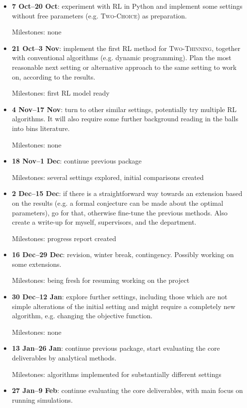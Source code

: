\documentclass[11pt,a4paper]{article}
\begin{document}
\begin{itemize}
    \item 
    \textbf{7 Oct--20 Oct}: experiment with RL in Python and implement some settings without free parameters (e.g. \textsc{Two-Choice}) as preparation.
    
    Milestones: none
    \item
    \textbf{21 Oct--3 Nov}: implement the first RL method for \textsc{Two-Thinning}, together with conventional algorithms (e.g. dynamic programming). Plan the most reasonable next setting or alternative approach to the same setting to work on, according to the results.
    
    Milestones: first RL model ready
    \item
    \textbf{4 Nov--17 Nov}: turn to other similar settings, potentially try multiple RL algorithms. It will also require some further background reading in the balls into bins literature.
    
    Milestones: none
    \item
    \textbf{18 Nov--1 Dec}: continue previous package
    
    Milestones: several settings explored, initial comparisons created
    \item
    \textbf{2 Dec--15 Dec}: if there is a straightforward way towards an extension based on the results (e.g. a formal conjecture can be made about the optimal parameters), go for that, otherwise fine-tune the previous methods. Also create a write-up for myself, supervisors, and the department.
   
    Milestones: progress report created
    \item
    \textbf{16 Dec--29 Dec}: revision, winter break, contingency. Possibly working on some extensions.
    
    Milestones: being fresh for resuming working on the project
    \item
    \textbf{30 Dec--12 Jan}: explore further settings, including those which are not simple alterations of the initial setting and might require a completely new algorithm, e.g. changing the objective function.
    
    Milestones: none
    \item
    \textbf{13 Jan--26 Jan}: continue previous package, start evaluating the core deliverables by analytical methods.
    
    Milestones: algorithms implemented for substantially different settings
    \item
    \textbf{27 Jan--9 Feb}: continue evaluating the core deliverables, with main focus on running simulations.
    

\end{itemize}
\end{document}
